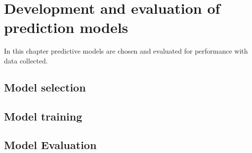 \setlength{\footskip}{8mm}

\chapter{Development and evaluation of prediction models}
\label{ch:depm}

In this chapter predictive models are chosen and evaluated for performance with data collected.

\section{Model selection}

\section{Model training}

\section{Model Evaluation}
